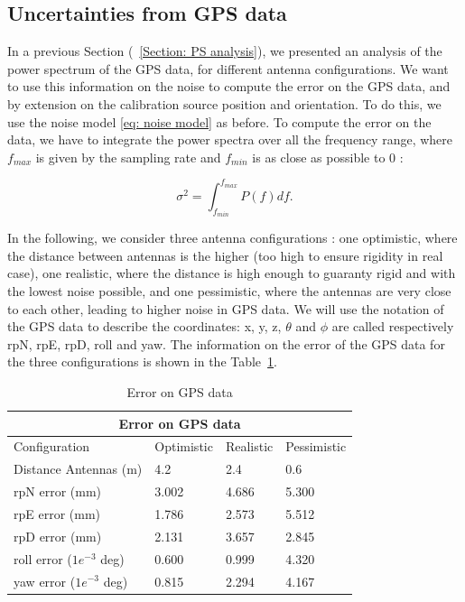 \documentclass[../../thesis.tex]{subfiles}
\begin{document}
\subsection{Uncertainties from GPS data}
In a previous Section (~\ref{Section: PS analysis}), we presented an analysis of the power spectrum of the GPS data, for different antenna configurations. We want to use this information on the noise to compute the error on the GPS data, and by extension on the calibration source position and orientation. To do this, we use the noise model \ref{eq: noise model} as before. To compute the error on the data, we have to integrate the power spectra over all the frequency range, where $f_{max}$ is given by the sampling rate and $f_{min}$ is as close as possible to 0 :

\begin{equation}
    \sigma^2 = \int^{f_{max}}_{f_{min}} P(f) df.
\end{equation}

In the following, we consider three antenna configurations : one optimistic, where the distance between antennas is the higher (too high to ensure rigidity in real case), one realistic, where the distance is high enough to guaranty rigid and with the lowest noise possible, and one pessimistic, where the antennas are very close to each other, leading to higher noise in GPS data. We will use the notation of the GPS data to describe the coordinates: x, y, z, $\theta$ and $\phi$ are called respectively rpN, rpE, rpD, roll and yaw. The information on the error of the GPS data for the three configurations is shown in the Table~\ref{tab: data error}.

\begin{table}[htbp]
    \centering
    \caption{Error on GPS data}
    \label{tab: data error}
    \begin{tabular}{|p{4cm}||p{2cm}|p{2cm}|p{2cm}|}
        \hline
        \multicolumn{4}{|c|}{Error on GPS data}                           \\
        \hline
        Configuration              & Optimistic & Realistic & Pessimistic \\
        \hline
        Distance Antennas (m)      & 4.2        & 2.4       & 0.6         \\
        \hline
        rpN error (mm)             & 3.002      & 4.686     & 5.300       \\
        rpE error (mm)             & 1.786      & 2.573     & 5.512       \\
        rpD error (mm)             & 2.131      & 3.657     & 2.845       \\
        roll error ($1e^{-3}$ deg) & 0.600      & 0.999     & 4.320       \\
        yaw  error ($1e^{-3}$ deg) & 0.815      & 2.294     & 4.167       \\
        \hline
    \end{tabular}
\end{table}
\end{document}

